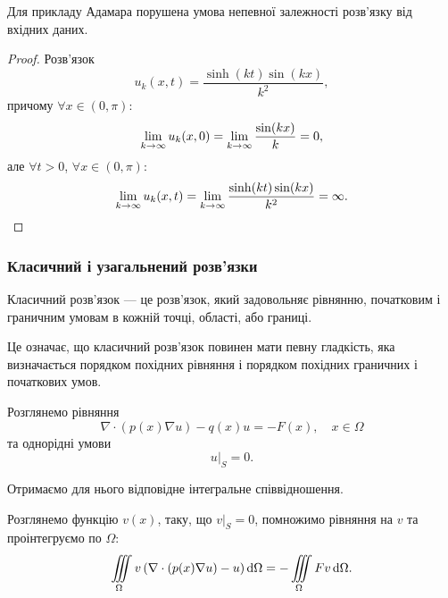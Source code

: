 \begin{proposition}
    Для прикладу Адамара порушена умова непевної залежності роз\-в'яз\-ку від вхідних даних.
\end{proposition}

\begin{proof}
    Розв'язок
    \begin{equation}
        u_k(x, t) = \frac{\sinh(k t) \sin (k x)}{k^2},
    \end{equation}
    причому $\forall x \in (0, \pi)$:
    \begin{equation}
        \displaystyle\lim\limits_{k \to \infty} u_k(x, 0) =  \displaystyle\lim\limits_{k \to \infty} \frac{\sin (k x)}{k} = 0,
    \end{equation}
    але $\forall t > 0$, $\forall x \in (0, \pi)$:
    \begin{equation}
        \displaystyle\lim\limits_{k \to \infty} u_k(x, t) =  \displaystyle\lim\limits_{k \to \infty} \frac{\sinh(k t) \sin (k x)}{k^2} = \infty.
    \end{equation}
\end{proof}

\subsubsection{Класичний і узагальнений розв'язки}

\begin{definition}
    Класичний розв'язок --- це розв'язок, який задовольняє рівнянню, початковим і граничним умовам в кожній точці, області, або границі.    
\end{definition}

Це означає, що класичний розв'язок повинен мати певну гладкість, яка визначається порядком похідних рівняння і порядком похідних граничних і початкових умов. \medskip

Розглянемо рівняння
\begin{equation}
    \label{eq:differential-equation}
    \nabla \cdot (p(x) \nabla u) - q(x) u = -F (x), \quad x \in \Omega
\end{equation}
та однорідні умови
\begin{equation}
    \label{eq:homogenuous-conditions}
    \left. u \right|_S = 0.
\end{equation}

Отримаємо для нього відповідне інтегральне співвідношення. \medskip

Розглянемо функцію $v(x)$, таку, що $\left. v \right|_S = 0$, помножимо рівняння на $v$ та проінтегруємо по $\Omega$:
\begin{equation}
    \displaystyle\iiint\limits_\Omega v \left(\nabla \cdot (p(x) \nabla u) - u \right) \mathop{}\!\mathrm{d} \Omega = - \displaystyle\iiint\limits_\Omega F v \mathop{}\!\mathrm{d} \Omega.    
\end{equation}

